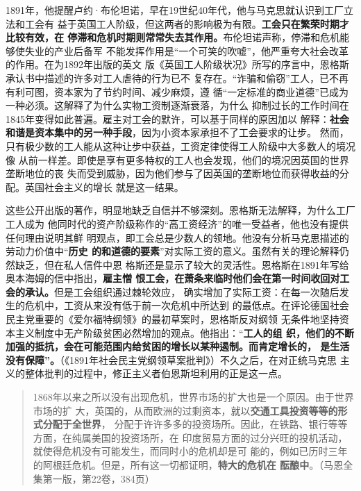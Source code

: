 1891年，他提醒卢约·布伦坦诺，早在19世纪40年代，他与马克思就认识到工厂立法和工会有
益于英国工人阶级，但这两者的影响极为有限。\textbf{工会只在繁荣时期才比较有效，在
  停滞和危机时期则常常失去其作用。}布伦坦诺声称，停滞和危机能够使失业的产业后备军
不能发挥作用是“一个可笑的吹嘘”，他严重夸大社会改革的作用。在为1892年出版的英文
版《英国工人阶级状况》所写的序言中，恩格斯承认书中描述的许多对工人虐待的行为已不
复存在。“诈骗和偷窃”工人，已不再有利可图，资本家为了节约时间、减少麻烦，遵
循“一定标准的商业道德”已成为一种必须。这解释了为什么实物工资制逐渐衰落，为什么
抑制过长的工作时间在1845年变得如此普遍。雇主对工会的默许，可以基于同样的原因加以
解释：\textbf{社会和谐是资本集中的另一种手段}，因为小资本家承担不了工会要求的让步。
然而，只有极少数的工人能从这种让步中获益，工资定律使得工人阶级中大多数人的境况像
从前一样差。即使是享有更多特权的工人也会发现，他们的境况因英国的世界垄断地位的丧
失而受到威胁，因为他们参与了因英国的垄断地位而获得收益的分配。英国社会主义的增长
就是这一结果。

这些公开出版的著作，明显地缺乏自信并不够深刻。恩格斯无法解释，为什么工厂工人成为
他同时代的资产阶级称作的“高工资经济”的唯一受益者，他也没有提供任何理由说明其鲜
明观点，即工会总是少数人的领地。他没有分析马克思描述的劳动力价值中“\textbf{历史
  的和道德的要素}”对实际工资的意义。虽然有关的理论解释仍然缺乏，但在私人信件中恩
格斯还是显示了较大的灵活性。恩格斯在1891年写给奥本海姆的信中指出，\textbf{雇主憎
  恨工会，在萧条来临时他们会在第一时间收回对工会的承认。}但是工会组织通过棘轮效应，
确实增加了实际工资：在每一次随后发生的危机中，工资从来没有低于前一次危机中所达到
的最低点。在评论德国社会民主党重要的《爱尔福特纲领》的最初草案时，恩格斯反对纲领
无条件地坚持资本主义制度中无产阶级贫困必然增加的观点。他指出：“\textbf{工人的组
  织，他们的不断加强的抵抗，会在可能范围内给贫困的增长以某种遏制。而肯定增长的，
  是生活没有保障”。}（《1891年社会民主党纲领草案批判》）不久之后，在对正统马克思
主义的整体批判的过程中，修正主义者伯恩斯坦利用的正是这一点。

\begin{quotation}
  1868年以来之所以没有出现危机，世界市场的扩大也是一个原因。由于世界市场的扩
  大，英国的，从而欧洲的过剩资本，就以\textbf{交通工具投资等等的形式分配于全世界}，
  分配于许许多多的投资场所。因此，在铁路、银行等等方面，在纯属美国的投资场所，在
  印度贸易方面的过分兴旺的投机活动，就使得危机没有可能发生，而同时小的危机却是可
  能的，例如已历时三年的阿根廷危机。但是，所有这一切都证明，\textbf{特大的危机在
    酝酿中}。（马恩全集第一版，第22卷，384页）
\end{quotation}

